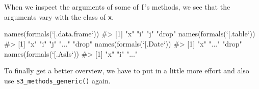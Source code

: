 \documentclass[
]{krantz}
\makeatletter
\newenvironment{Shaded}{\begin{snugshade}}{\end{snugshade}}
\newcommand{\CommentTok}[1]{\textcolor[rgb]{0.56,0.35,0.01}{\textit{#1}}}
\newcommand{\DataTypeTok}[1]{\textcolor[rgb]{0.13,0.29,0.53}{#1}}
\newcommand{\KeywordTok}[1]{\textcolor[rgb]{0.13,0.29,0.53}{\textbf{#1}}}
\newcommand{\NormalTok}[1]{#1}
\newcommand{\StringTok}[1]{\textcolor[rgb]{0.31,0.60,0.02}{#1}}
\newenvironment{kframe}{%
\medskip{}
\setlength{\fboxsep}{.8em}
 \def\at@end@of@kframe{}%
 \ifinner\ifhmode%
  \def\at@end@of@kframe{\end{minipage}}%
  \begin{minipage}{\columnwidth}%
 \fi\fi%
 \def\FrameCommand##1{\hskip\@totalleftmargin \hskip-\fboxsep
 \colorbox{shadecolor}{##1}\hskip-\fboxsep
     \hskip-\linewidth \hskip-\@totalleftmargin \hskip\columnwidth}%
 \MakeFramed {\advance\hsize-\width
   \@totalleftmargin\z@ \linewidth\hsize
   \@setminipage}}%
 {\par\unskip\endMakeFramed%
 \at@end@of@kframe}
\renewenvironment{Shaded}{\begin{kframe}}{\end{kframe}}
\renewcommand{\KeywordTok} [1]{\textcolor[rgb]{0.00,0.44,0.13}{{#1}}}
\renewcommand{\DataTypeTok}[1]{\textcolor[rgb]{0.56,0.13,0.00}{{#1}}}
\renewcommand{\StringTok}  [1]{\textcolor[rgb]{0.25,0.44,0.63}{{#1}}}
\renewcommand{\CommentTok} [1]{\textcolor[rgb]{0.38,0.63,0.69}{{#1}}}
\renewcommand{\NormalTok}  [1]{{#1}}
\makeatother
\begin{document}
When we inspect the arguments of some of \texttt{{[}}'s methods, we see that the arguments vary with the class of \texttt{x}.

\begin{Shaded}
\begin{Highlighting}[]
\KeywordTok{names}\NormalTok{(}\KeywordTok{formals}\NormalTok{(}\StringTok{`}\DataTypeTok{[.data.frame}\StringTok{`}\NormalTok{))}
\CommentTok{#> [1] "x"    "i"    "j"    "drop"}
\KeywordTok{names}\NormalTok{(}\KeywordTok{formals}\NormalTok{(}\StringTok{`}\DataTypeTok{[.table}\StringTok{`}\NormalTok{))}
\CommentTok{#> [1] "x"    "i"    "j"    "..."  "drop"}
\KeywordTok{names}\NormalTok{(}\KeywordTok{formals}\NormalTok{(}\StringTok{`}\DataTypeTok{[.Date}\StringTok{`}\NormalTok{))}
\CommentTok{#> [1] "x"    "..."  "drop"}
\KeywordTok{names}\NormalTok{(}\KeywordTok{formals}\NormalTok{(}\StringTok{`}\DataTypeTok{[.AsIs}\StringTok{`}\NormalTok{))}
\CommentTok{#> [1] "x"   "i"   "..."}
\end{Highlighting}
\end{Shaded}

To finally get a better overview, we have to put in a little more effort and also use \texttt{s3\_methods\_generic()} again.
\end{document}

